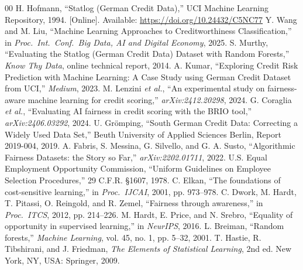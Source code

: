 \documentclass[conference]{IEEEtran}
\begin{document}
\begin{thebibliography}{00}
 H. Hofmann, ``Statlog (German Credit Data),'' UCI Machine Learning Repository, 1994. [Online]. Available: \url{https://doi.org/10.24432/C5NC77}
 Y. Wang and M. Liu, ``Machine Learning Approaches to Creditworthiness Classification,'' in \emph{Proc.\ Int.\ Conf.\ Big Data, AI and Digital Economy}, 2025.
 S. Murthy, ``Evaluating the Statlog (German Credit Data) Dataset with Random Forests,'' \emph{Know Thy Data}, online technical report, 2014.
 A. Kumar, ``Exploring Credit Risk Prediction with Machine Learning: A Case Study using German Credit Dataset from UCI,'' \emph{Medium}, 2023.
 M. Lenzini \emph{et al.}, ``An experimental study on fairness-aware machine learning for credit scoring,'' \emph{arXiv:2412.20298}, 2024.
 G. Coraglia \emph{et al.}, ``Evaluating AI fairness in credit scoring with the BRIO tool,'' \emph{arXiv:2406.03292}, 2024.
 U. Gr\"omping, ``South German Credit Data: Correcting a Widely Used Data Set,'' Beuth University of Applied Sciences Berlin, Report 2019-004, 2019.
 A. Fabris, S. Messina, G. Silvello, and G. A. Susto, ``Algorithmic Fairness Datasets: the Story so Far,'' \emph{arXiv:2202.01711}, 2022.
 U.S. Equal Employment Opportunity Commission, ``Uniform Guidelines on Employee Selection Procedures,'' 29 C.F.R. \S 1607, 1978.
 C. Elkan, ``The foundations of cost-sensitive learning,'' in \emph{Proc.\ IJCAI}, 2001, pp. 973--978.
 C. Dwork, M. Hardt, T. Pitassi, O. Reingold, and R. Zemel, ``Fairness through awareness,'' in \emph{Proc.\ ITCS}, 2012, pp. 214--226.
 M. Hardt, E. Price, and N. Srebro, ``Equality of opportunity in supervised learning,'' in \emph{NeurIPS}, 2016.
 L. Breiman, ``Random forests,'' \emph{Machine Learning}, vol. 45, no. 1, pp. 5--32, 2001.
 T. Hastie, R. Tibshirani, and J. Friedman, \emph{The Elements of Statistical Learning}, 2nd ed. New York, NY, USA: Springer, 2009.
\end{thebibliography}
\end{document}
